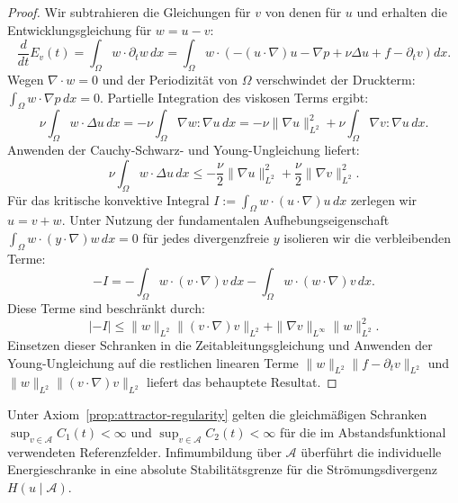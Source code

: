 \documentclass[12pt,a4paper]{article}
\theoremstyle{definition}
\theoremstyle{plain}
\theoremstyle{remark}
\begin{document}
\begin{proof}
Wir subtrahieren die Gleichungen für $v$ von denen für $u$ und erhalten die Entwicklungsgleichung für $w = u - v$:
\begin{equation}
    \frac{d}{dt} E_{v}(t) = \int_\Omega w \cdot \partial_t w \, dx = \int_\Omega w \cdot \left( -(u \cdot \nabla)u - \nabla p + \nu \Delta u + f - \partial_t v \right) dx.
\end{equation}
Wegen $\nabla \cdot w = 0$ und der Periodizität von $\Omega$ verschwindet der Druckterm: $\int_\Omega w \cdot \nabla p \, dx = 0$.
Partielle Integration des viskosen Terms ergibt:
\begin{equation}
    \nu \int_\Omega w \cdot \Delta u \, dx = - \nu \int_\Omega \nabla w : \nabla u \, dx = - \nu \|\nabla u\|_{L^2}^2 + \nu \int_\Omega \nabla v : \nabla u \, dx.
\end{equation}
Anwenden der Cauchy-Schwarz- und Young-Ungleichung liefert:
\begin{equation}
    \nu \int_\Omega w \cdot \Delta u \, dx \le - \frac{\nu}{2} \|\nabla u\|_{L^2}^2 + \frac{\nu}{2} \|\nabla v\|_{L^2}^2.
\end{equation}
Für das kritische konvektive Integral $I := \int_\Omega w \cdot (u \cdot \nabla)u \, dx$ zerlegen wir $u = v + w$. Unter Nutzung der fundamentalen Aufhebungseigenschaft $\int_\Omega w \cdot (y \cdot \nabla)w \, dx = 0$ für jedes divergenzfreie $y$ isolieren wir die verbleibenden Terme:
\begin{equation}
    - I = - \int_\Omega w \cdot (v \cdot \nabla)v \, dx - \int_\Omega w \cdot (w \cdot \nabla)v \, dx.
\end{equation}
Diese Terme sind beschränkt durch:
\begin{equation}
    |-I| \le \|w\|_{L^2} \|(v \cdot \nabla)v\|_{L^2} + \|\nabla v\|_{L^\infty} \|w\|_{L^2}^2.
\end{equation}
Einsetzen dieser Schranken in die Zeitableitungsgleichung und Anwenden der Young-Ungleichung auf die restlichen linearen Terme $\|w\|_{L^2} \|f - \partial_t v\|_{L^2}$ und $\|w\|_{L^2} \|(v \cdot \nabla)v\|_{L^2}$ liefert das behauptete Resultat.
\end{proof}

Unter Axiom~\ref{prop:attractor-regularity} gelten die gleichmäßigen Schranken $\sup_{v \in \mathcal{A}} C_1(t) < \infty$ und $\sup_{v \in \mathcal{A}} C_2(t) < \infty$ für die im Abstandsfunktional verwendeten Referenzfelder. Infimumbildung über $\mathcal{A}$ überführt die individuelle Energieschranke in eine absolute Stabilitätsgrenze für die Strömungsdivergenz $H(u \mid \mathcal{A})$.
\end{document}
